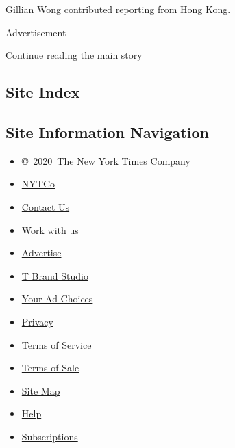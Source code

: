 Gillian Wong contributed reporting from Hong Kong.

Advertisement

\protect\hyperlink{after-bottom}{Continue reading the main story}

\hypertarget{site-index}{%
\subsection{Site Index}\label{site-index}}

\hypertarget{site-information-navigation}{%
\subsection{Site Information
Navigation}\label{site-information-navigation}}

\begin{itemize}
\tightlist
\item
  \href{https://help.nytimes3xbfgragh.onion/hc/en-us/articles/115014792127-Copyright-notice}{©~2020~The
  New York Times Company}
\end{itemize}

\begin{itemize}
\tightlist
\item
  \href{https://www.nytco.com/}{NYTCo}
\item
  \href{https://help.nytimes3xbfgragh.onion/hc/en-us/articles/115015385887-Contact-Us}{Contact
  Us}
\item
  \href{https://www.nytco.com/careers/}{Work with us}
\item
  \href{https://nytmediakit.com/}{Advertise}
\item
  \href{http://www.tbrandstudio.com/}{T Brand Studio}
\item
  \href{https://www.nytimes3xbfgragh.onion/privacy/cookie-policy\#how-do-i-manage-trackers}{Your
  Ad Choices}
\item
  \href{https://www.nytimes3xbfgragh.onion/privacy}{Privacy}
\item
  \href{https://help.nytimes3xbfgragh.onion/hc/en-us/articles/115014893428-Terms-of-service}{Terms
  of Service}
\item
  \href{https://help.nytimes3xbfgragh.onion/hc/en-us/articles/115014893968-Terms-of-sale}{Terms
  of Sale}
\item
  \href{https://spiderbites.nytimes3xbfgragh.onion}{Site Map}
\item
  \href{https://help.nytimes3xbfgragh.onion/hc/en-us}{Help}
\item
  \href{https://www.nytimes3xbfgragh.onion/subscription?campaignId=37WXW}{Subscriptions}
\end{itemize}
